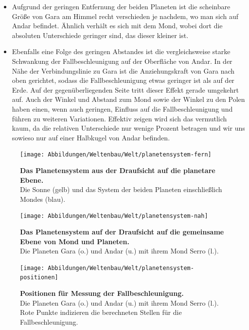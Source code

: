 \begin{itemize}
	\item Aufgrund der geringen Entfernung der beiden Planeten ist die scheinbare Größe von Gara am Himmel recht verschieden je nachdem, wo man sich auf Andar befindet. Ähnlich verhält es sich mit dem Mond, wobei dort die absoluten Unterschiede geringer sind, das dieser kleiner ist.
	\item Ebenfalls eine Folge des geringen Abstandes ist die vergleichsweise starke Schwankung der Fallbeschleunigung auf der Oberfläche von Andar. In der Nähe der Verbindungslinie zu Gara ist die Anziehungskraft von Gara nach oben gerichtet, sodass die Fallbeschleunigung etwas geringer ist als auf der Erde. Auf der gegenüberliegenden Seite tritt dieser Effekt gerade umgekehrt auf. Auch der Winkel und Abstand zum Mond sowie der Winkel zu den Polen haben einen, wenn auch geringen, Einfluss auf die Fallbeschleunigung und führen zu weiteren Variationen. Effektiv zeigen wird sich das vermutlich kaum, da die relativen Unterschiede nur wenige Prozent betragen und wir uns sowieso nur auf einer Halbkugel von Andar befinden.
\end{itemize}

\begin{figure}[tbh]
	\centering
	\texttt{[image: Abbildungen/Weltenbau/Welt/planetensystem-fern]}
	\caption[Planetensystem Skizzen 1]{\textbf{Das Planetensystem aus der Draufsicht auf die planetare Ebene.}\\
	Die Sonne (gelb) und das System der beiden Planeten einschließlich Mondes (blau).}
	\label{fig:planetensystem-nah}
\end{figure}

\begin{figure}[tbh]
	\centering
	\texttt{[image: Abbildungen/Weltenbau/Welt/planetensystem-nah]}
	\caption[Planetensystem Skizzen 2]{\textbf{Das Planetensystem auf der Draufsicht auf die gemeinsame Ebene von Mond und Planeten.}\\
	Die Planeten Gara (o.) und Andar (u.) mit ihrem Mond Serro (l.).}
	\label{fig:planetensystem-fern}
\end{figure}

\begin{figure}[tbh]
	\centering
	\texttt{[image: Abbildungen/Weltenbau/Welt/planetensystem-positionen]}
	\caption[Planetensystem Skizzen 3]{\textbf{Positionen für Messung der Fallbeschleunigung.}\\
	Die Planeten Gara (o.) und Andar (u.) mit ihrem Mond Serro (l.). Rote Punkte indizieren die berechneten Stellen für die Fallbeschleunigung.}
	\label{fig:planetensystem-positionen}
\end{figure}

